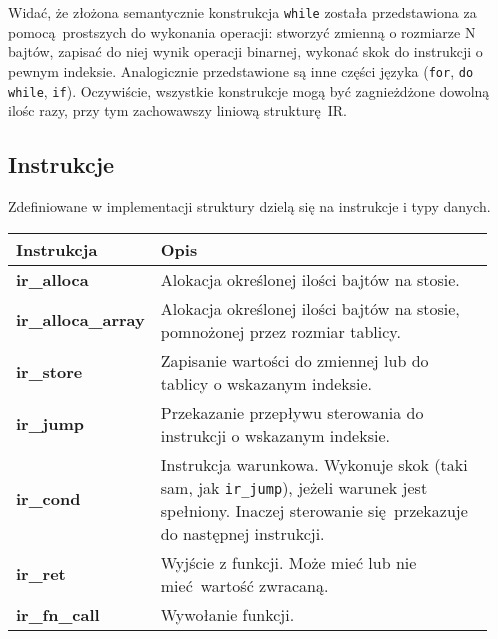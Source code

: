 		Widać, że złożona semantycznie konstrukcja \texttt{while} została
		przedstawiona za pomocą prostszych do wykonania operacji: stworzyć
		zmienną o rozmiarze N bajtów, zapisać do niej wynik operacji binarnej,
		wykonać skok do instrukcji o pewnym indeksie. Analogicznie przedstawione są
		inne części języka (\texttt{for}, \texttt{do while}, \texttt{if}). Oczywiście,
		wszystkie konstrukcje mogą być zagnieżdżone dowolną ilośc razy, przy tym
		zachowawszy liniową strukturę IR.

	\subsection{Instrukcje}

	Zdefiniowane w implementacji struktury dzielą się
	na instrukcje i typy danych.

	\begin{center}
		\setlength{\tabcolsep}{0.5em}
		\renewcommand{\arraystretch}{1.5}
		\begin{tabular}{| L{0.2\linewidth} | L{0.75\linewidth} | }
			\hline
			\textbf{Instrukcja} & \textbf{Opis} \\
			\hline
			\textcolor{instrc}{\textbf{ir\_alloca}}
				& Alokacja określonej ilości bajtów
                 na stosie. \\
			\hline
			\textcolor{instrc}{\textbf{ir\_alloca\_array}}
            	& Alokacja określonej ilości bajtów
				  na stosie, pomnożonej przez rozmiar
                  tablicy. \\
			\hline
			\textcolor{instrc}{\textbf{ir\_store}} 
				& Zapisanie wartości do zmiennej
                  lub do tablicy o wskazanym
                  indeksie. \\
			\hline

			\textcolor{instrc}{\textbf{ir\_jump}}
				& Przekazanie przepływu sterowania
                  do instrukcji o wskazanym indeksie. \\
			\hline
			\textcolor{instrc}{\textbf{ir\_cond}}
				& Instrukcja warunkowa. Wykonuje skok
         	     (taki sam, jak \texttt{ir\_jump}),
                  jeżeli warunek jest spełniony.
                  Inaczej sterowanie się przekazuje
                  do następnej instrukcji. \\
			\hline
			\textcolor{instrc}{\textbf{ir\_ret}}
				& Wyjście z funkcji. Może mieć lub nie
                  mieć wartość zwracaną. \\
  			\hline
  			\textcolor{instrc}{\textbf{ir\_fn\_call}}
                & Wywołanie funkcji. \\
            \hline
		\end{tabular}
	\end{center}
	
